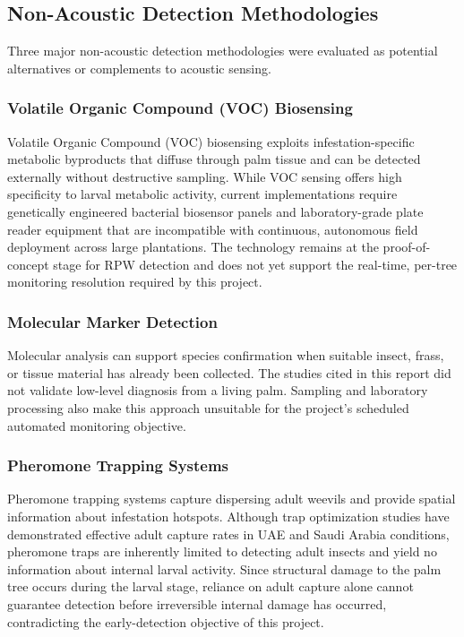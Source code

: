 \documentclass[12pt,a4paper,oneside]{memoir}
\begin{document}
\subsection{Non-Acoustic Detection Methodologies}

Three major non-acoustic detection methodologies were evaluated as potential alternatives or complements to acoustic sensing.

\subsubsection{Volatile Organic Compound (VOC) Biosensing}
Volatile Organic Compound (VOC) biosensing exploits infestation-specific metabolic byproducts that diffuse through palm tissue and can be detected externally without destructive sampling. While VOC sensing offers high specificity to larval metabolic activity, current implementations require genetically engineered bacterial biosensor panels and laboratory-grade plate reader equipment that are incompatible with continuous, autonomous field deployment across large plantations. The technology remains at the proof-of-concept stage for RPW detection and does not yet support the real-time, per-tree monitoring resolution required by this project.

\subsubsection{Molecular Marker Detection}
Molecular analysis can support species confirmation when suitable insect, frass, or tissue material has already been collected. The studies cited in this report did not validate low-level diagnosis from a living palm. Sampling and laboratory processing also make this approach unsuitable for the project's scheduled automated monitoring objective.

\subsubsection{Pheromone Trapping Systems}
Pheromone trapping systems capture dispersing adult weevils and provide spatial information about infestation hotspots. Although trap optimization studies have demonstrated effective adult capture rates in UAE and Saudi Arabia conditions, pheromone traps are inherently limited to detecting adult insects and yield no information about internal larval activity. Since structural damage to the palm tree occurs during the larval stage, reliance on adult capture alone cannot guarantee detection before irreversible internal damage has occurred, contradicting the early-detection objective of this project.
\end{document}
